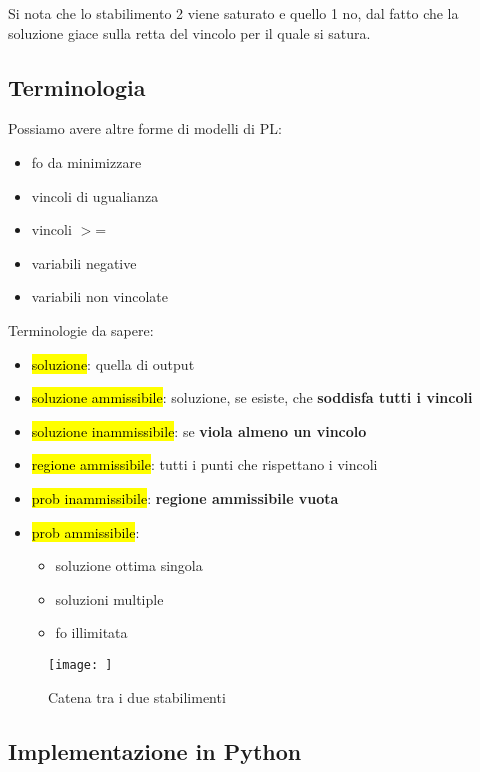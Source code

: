 Si nota che lo stabilimento 2 viene saturato e quello 1 no, dal fatto che la soluzione giace sulla retta del vincolo per il quale si satura.


\subsection{Terminologia}

Possiamo avere altre forme di modelli di PL:

\begin{itemize}
	\item fo da minimizzare
	\item vincoli di ugualianza
	\item vincoli $>$=
	\item variabili negative
	\item variabili non vincolate
\end{itemize}


Terminologie da sapere:

\begin{itemize}
	\item \hl{soluzione}: quella di output
	\item \hl{soluzione ammissibile}: soluzione, se esiste, che \textbf{soddisfa tutti i vincoli}
	\item \hl{soluzione inammissibile}: se \textbf{viola almeno un vincolo} 
	\item \hl{regione ammissibile}: tutti i punti che rispettano i vincoli
	\item \hl{prob inammissibile}: \textbf{regione ammissibile vuota}
	\item \hl{prob ammissibile}:
		\begin{itemize}
			\item soluzione ottima singola
			\item soluzioni multiple
			\item fo illimitata
		\end{itemize}
\end{itemize}


\begin{figure}[H]
\centering
\texttt{[image: ]}
\caption{Catena tra i due stabilimenti} 
\label{st12}
\end{figure}

	
	
\subsection{Implementazione in Python}

